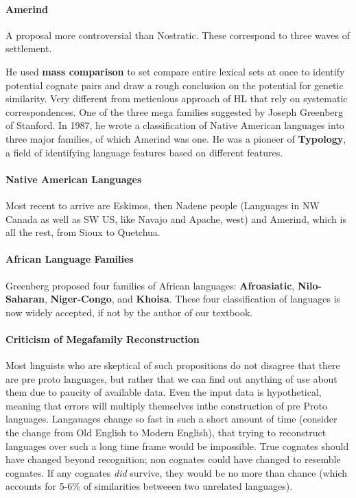 \documentclass{exam}
\begin{document}
\paragraph{Amerind}A proposal more controversial than Nostratic. These correspond to three waves of settlement. 

He used \textbf{mass comparison} to set compare entire lexical sets at once to identify potential cognate pairs and draw a rough conclusion on the potential for genetic similarity. 
Very different from meticulous approach of HL that rely on systematic correspondences. 
One of the three mega families suggested by Joseph Greenberg of Stanford. 
In 1987, he wrote a classification of Native American languages into three major families, of which Amerind was one. 
He was a pioneer of \textbf{Typology}, a field of identifying language features based on different features. 


\paragraph{Native American Languages}Most recent to arrive are Eskimos, then Nadene people (Languages in NW Canada as well as SW US, like Navajo and Apache, west) and Amerind, which is all the rest, from Sioux to Quetchua. 


\paragraph{African Language Families} Greenberg proposed four families of African languages: \textbf{Afroasiatic}, \textbf{Nilo-Saharan}, \textbf{Niger-Congo}, and \textbf{Khoisa}. 
These four classification of languages is now widely accepted, if not by the author of our textbook. 


\paragraph{Criticism of Megafamily Reconstruction} Most linguists who are skeptical of such propositions do not disagree that there are pre proto languages, but rather that we can find out anything of use about them due to paucity of available data. 
Even the input data is hypothetical, meaning that errors will multiply themselves inthe construction of pre Proto languages. 
Langauages change so fast in such a short amount of time (consider the change from Old English to Modern English), that trying to reconstruct languages over such a long time frame would be impossible. 
True cognates should have changed beyond recognition; non cognates could have changed to resemble cognates. 
If any cognates \textit{did} survive, they would be no more than chance (which accounts for 5-6\% of similarities betweeen two unrelated languages). 
\end{document}
